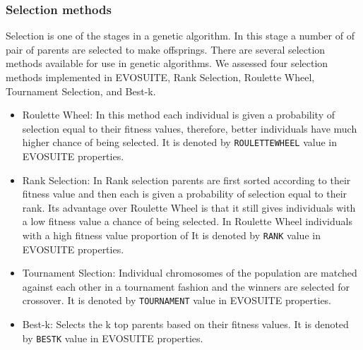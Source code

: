 \documentclass[sigconf]{acmart}
\begin{document}
\subsubsection{Selection methods}
Selection is one of the stages in a genetic algorithm. In this stage a number of of pair of parents
are selected to make offsprings. There are several selection methods available for use in genetic algorithms.
We assessed four selection methods implemented in EVOSUITE, Rank Selection, Roulette Wheel, Tournament Selection, 
and Best-k.
\begin{itemize}
  \item{Roulette Wheel}: In this method each individual is given a probability of selection equal to 
  their fitness values, therefore, better individuals have much higher chance of being selected. It is denoted
  by \verb|ROULETTEWHEEL| value in EVOSUITE properties.
  \item{Rank Selection}: In Rank selection parents are first sorted according to their fitness 
  value and then each is given a probability of selection equal to their rank. Its advantage over 
  Roulette Wheel is that it still gives individuals with a low fitness value a chance of being selected.
  In Roulette Wheel individuals with a high fitness value  proportion of 
  It is denoted by \verb|RANK| value in EVOSUITE properties.
  \item{Tournament Slection}: Individual chromosomes of the population are matched against each other
  in a tournament fashion and the winners are selected for crossover. It is denoted
  by \verb|TOURNAMENT| value in EVOSUITE properties.
  \item{Best-k}: Selects the k top parents based on their fitness values. It is denoted
  by \verb|BESTK| value in EVOSUITE properties.
\end{itemize}
\end{document}
